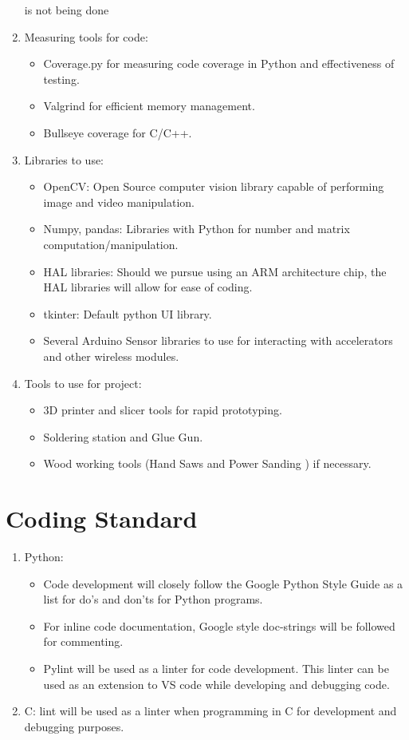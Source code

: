 \documentclass{article}
\begin{document}
\begin{enumerate}
  is not being done
\item Measuring tools for code:
\begin{itemize}
\item Coverage.py for measuring code coverage in Python and effectiveness of testing.
\item Valgrind for efficient memory management.
\item Bullseye coverage for C/C++.
\end{itemize}
\item Libraries to use:
\begin{itemize}
\item OpenCV: Open Source computer vision library capable of performing image and video manipulation.
\item Numpy, pandas: Libraries with Python for number and matrix computation/manipulation.
\item HAL libraries: Should we pursue using an ARM architecture chip, the HAL libraries will allow for ease of coding.
\item tkinter: Default python UI library.
\item Several Arduino Sensor libraries to use for interacting with accelerators and other wireless modules.
\end{itemize}
\item Tools to use for project:
\begin{itemize}
\item 3D printer and slicer tools for rapid prototyping.
\item Soldering station and Glue Gun.
\item Wood working tools (Hand Saws and Power Sanding ) if necessary.
\end{itemize}
\end{enumerate}

\section{Coding Standard}
\begin{enumerate}
\item Python:
\begin{itemize} 
\item Code development will closely follow the Google Python Style Guide as a list for do's and don'ts for Python programs.
\item For inline code documentation, Google style doc-strings will be followed for commenting.
\item Pylint will be used as a linter for code development. This linter can be used as an extension to VS code while developing and debugging code.
\end{itemize}
\item C: lint will be used as a linter when programming in C for development and debugging purposes.
\end{enumerate}
\end{document}
